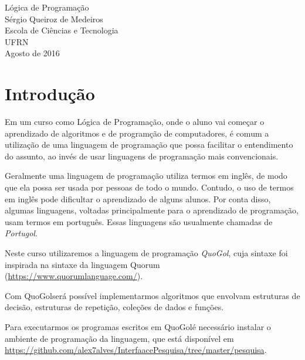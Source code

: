 \documentclass{report}
\newcommand{\Qgol}{QuoGol\;}
\begin{document}
\thispagestyle{empty}
\begin{center}

\begin{center}
\end{center}
\vspace{6cm}
\Huge{Lógica de Programação}\\
\vspace{1.5cm}
\Large{Sérgio Queiroz de Medeiros} \\
\Large{Escola de Ciências e Tecnologia} \\
\Large{UFRN}
\vspace{5cm}
\\
\large{Agosto de 2016}
\end{center}

\tableofcontents

\pagebreak




\chapter{Introdução}

Em um curso como Lógica de Programação, onde o aluno
vai começar o aprendizado de algoritmos e de programção
de computadores, é comum a utilização de uma linguagem
de programação que possa facilitar o entendimento do
assunto, ao invés de usar linguagens de programação
mais convencionais.

Geralmente uma linguagem de programação utiliza termos em inglês,
de modo que ela possa ser usada por pessoas de todo o mundo.
Contudo, o uso de termos em inglês pode dificultar o aprendizado
de alguns alunos. Por conta disso, algumas linguagens, voltadas
principalmente para o aprendizado de programação, usam termos em
português. Essas linguagens são usualmente chamadas de \emph{Portugol}.

Neste curso utilizaremos a linguagem de programação \emph{\Qgol},
cuja sintaxe foi inspirada na sintaxe da linguagem Quorum
(\url{https://www.quorumlanguage.com/}).

Com \Qgol será possível implementarmos algoritmos que envolvam
estruturas de decisão, estruturas de repetição, coleções de dados
e funções.

Para executarmos os programas escritos em \Qgol é necessário
instalar o ambiente de programação da linguagem, que está disponível em
\url{https://github.com/alex7alves/InterfaacePesquisa/tree/master/pesquisa}.
\end{document}

